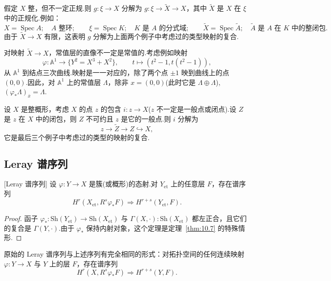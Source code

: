 \begin{example}\label{ex:12.5}
假定 $X$ 整，但不一定正规.则 $g \colon \xi \to X$ 分解为 $g \colon \xi \to \widetilde{X} \to X$，其中 $\widetilde{X}$ 是 $X$ 在 $\xi$ 中的正规化.例如：
\[
X = \operatorname{Spec} A; \quad A \text{ 整环};
\qquad
\xi = \operatorname{Spec} K; \quad K \text{ 是 } A \text{ 的分式域};
\qquad
\widetilde{X} = \operatorname{Spec} \widetilde{A}; \quad \widetilde{A} \text{ 是 } A \text{ 在 } K \text{ 中的整闭包}.
\]
由于 $\widetilde{X} \to X$ 有限，这表明 $g$ 分解为上面两个例子中考虑过的类型映射的复合.

对映射 $\widetilde{X} \to X$，常值层的直像不一定是常值的.考虑例如映射
\[
\varphi \colon \mathbb{A}^{1} \to \{Y^{2} = X^{3} + X^{2}\}, \qquad t \mapsto (t^{2} - 1, t(t^{2} - 1)),
\]
从 $\mathbb{A}^{1}$ 到结点三次曲线.映射是一一对应的，除了两个点 $\pm 1$ 映到曲线上的点 $(0, 0)$.因此，对 $\mathbb{A}^{1}$ 上的常值层 $\Lambda$，除非 $x = (0, 0)$(此时它是 $\Lambda \oplus \Lambda$), $(\varphi_{*}\Lambda)_{\bar{x}} = \Lambda$.
\end{example}

\begin{example}\label{ex:12.6}
设 $X$ 是整概形，考虑 $X$ 的点 $z$ 的包含 $i \colon z \to X$($z$ 不一定是一般点或闭点).设 $Z$ 是 $z$ 在 $X$ 中的闭包，则 $Z$ 不可约且 $z$ 是它的一般点.则 $i$ 分解为
\[
z \to \widetilde{Z} \to Z \hookrightarrow X,
\]
它是最后三个例子中考虑过的类型的映射的复合.
\end{example}

\subsection*{Leray 谱序列}

\begin{theorem}\label{thm:12.7}[Leray 谱序列]
设 $\varphi \colon Y \to X$ 是簇(或概形)的态射.对 $Y_{\mathrm{et}}$ 上的任意层 $F$，存在谱序列
\[
H^{r}(X_{\mathrm{et}}, R^{s}\varphi_{*}F) \Rightarrow H^{r+s}(Y_{\mathrm{et}}, F).
\]
\end{theorem}

\begin{proof}
函子 $\varphi_{*} \colon \mathrm{Sh}(Y_{\mathrm{et}}) \to \mathrm{Sh}(X_{\mathrm{et}})$ 与 $\Gamma(X, \cdot) \colon \mathrm{Sh}(X_{\mathrm{et}})$ 都左正合，且它们的复合是 $\Gamma(Y, \cdot)$.由于 $\varphi_{*}$ 保持内射对象，这个定理是定理~\ref{thm:10.7} 的特殊情形.
\end{proof}

原始的 Leray 谱序列与上述序列有完全相同的形式：对拓扑空间的任何连续映射 $\varphi \colon Y \to X$ 与 $Y$ 上的层 $F$，存在谱序列
\[
H^{r}(X, R^{s}\varphi_{*}F) \Rightarrow H^{r+s}(Y, F).
\]

